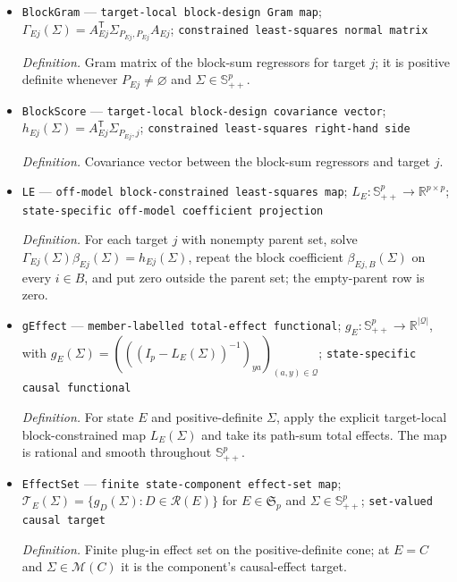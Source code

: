 \documentclass{article}
\begin{document}
\begin{itemize}
  \item \texttt{BlockGram} --- \texttt{target-\allowbreak{}local block-\allowbreak{}design Gram map}; \(\Gamma_{Ej}(\Sigma)=A_{Ej}^{\mathsf T}\Sigma_{P_{Ej},P_{Ej}}A_{Ej}\); \texttt{constrained least-\allowbreak{}squares normal matrix}
  \par\smallskip\noindent\emph{Definition.} Gram matrix of the block-sum regressors for target \(j\); it is positive definite whenever \(P_{Ej}\neq\varnothing\) and \(\Sigma\in\mathbb S^p_{++}\).
  \item \texttt{BlockScore} --- \texttt{target-\allowbreak{}local block-\allowbreak{}design covariance vector}; \(h_{Ej}(\Sigma)=A_{Ej}^{\mathsf T}\Sigma_{P_{Ej},j}\); \texttt{constrained least-\allowbreak{}squares right-\allowbreak{}hand side}
  \par\smallskip\noindent\emph{Definition.} Covariance vector between the block-sum regressors and target \(j\).
  \item \texttt{LE} --- \texttt{off-\allowbreak{}model block-\allowbreak{}constrained least-\allowbreak{}squares map}; \(L_E:\mathbb S^p_{++}\to\mathbb R^{p\times p}\); \texttt{state-\allowbreak{}specific off-\allowbreak{}model coefficient projection}
  \par\smallskip\noindent\emph{Definition.} For each target \(j\) with nonempty parent set, solve \(\Gamma_{Ej}(\Sigma)\beta_{Ej}(\Sigma)=h_{Ej}(\Sigma)\), repeat the block coefficient \(\beta_{Ej,B}(\Sigma)\) on every \(i\in B\), and put zero outside the parent set; the empty-parent row is zero.
  \item \texttt{gEffect} --- \texttt{member-\allowbreak{}labelled total-\allowbreak{}effect functional}; \(g_E:\mathbb S^p_{++}\to\mathbb R^{|\mathcal Q|}\), with \(g_E(\Sigma)=(((I_p-L_E(\Sigma))^{-1})_{ya})_{(a,y)\in\mathcal Q}\); \texttt{state-\allowbreak{}specific causal functional}
  \par\smallskip\noindent\emph{Definition.} For state \(E\) and positive-definite \(\Sigma\), apply the explicit target-local block-constrained map \(L_E(\Sigma)\) and take its path-sum total effects. The map is rational and smooth throughout \(\mathbb S^p_{++}\).
  \item \texttt{EffectSet} --- \texttt{finite state-\allowbreak{}component effect-\allowbreak{}set map}; \(\mathcal T_E(\Sigma)=\{g_D(\Sigma):D\in\mathcal R(E)\}\) for \(E\in\mathfrak S_p\) and \(\Sigma\in\mathbb S^p_{++}\); \texttt{set-\allowbreak{}valued causal target}
  \par\smallskip\noindent\emph{Definition.} Finite plug-in effect set on the positive-definite cone; at \(E=C\) and \(\Sigma\in\mathcal M(C)\) it is the component's causal-effect target.

\end{itemize}
\end{document}
